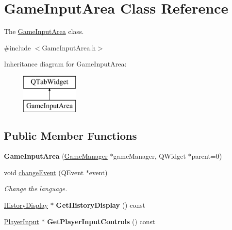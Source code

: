 \hypertarget{classGameInputArea}{\section{Game\-Input\-Area Class Reference}
\label{classGameInputArea}
}


The \hyperlink{classGameInputArea}{Game\-Input\-Area} class.  




{\ttfamily \#include $<$Game\-Input\-Area.\-h$>$}

Inheritance diagram for Game\-Input\-Area\-:\begin{figure}[H]
\begin{center}
\leavevmode
\includegraphics[height=2.000000cm]{classGameInputArea}
\end{center}
\end{figure}
\subsection*{Public Member Functions}
\begin{DoxyCompactItemize}
\item 
\hypertarget{classGameInputArea_a37bb000732d3b5e4f98923d4a753991e}{{\bfseries Game\-Input\-Area} (\hyperlink{classGameManager}{Game\-Manager} $\ast$game\-Manager, Q\-Widget $\ast$parent=0)}\label{classGameInputArea_a37bb000732d3b5e4f98923d4a753991e}

\item 
void \hyperlink{classGameInputArea_aeda3377d2dd4b04fe530ef96b52162ea}{change\-Event} (Q\-Event $\ast$event)
\begin{DoxyCompactList}\small\item\em Change the language. \end{DoxyCompactList}\item 
\hypertarget{classGameInputArea_a490df7daa012d358294f715bdb6addf6}{\hyperlink{classHistoryDisplay}{History\-Display} $\ast$ {\bfseries Get\-History\-Display} () const }\label{classGameInputArea_a490df7daa012d358294f715bdb6addf6}

\item 
\hypertarget{classGameInputArea_ad68c49dd0996e9661d84cd778ebcb4ef}{\hyperlink{classPlayerInput}{Player\-Input} $\ast$ {\bfseries Get\-Player\-Input\-Controls} () const }\label{classGameInputArea_ad68c49dd0996e9661d84cd778ebcb4ef}

\end{DoxyCompactItemize}


